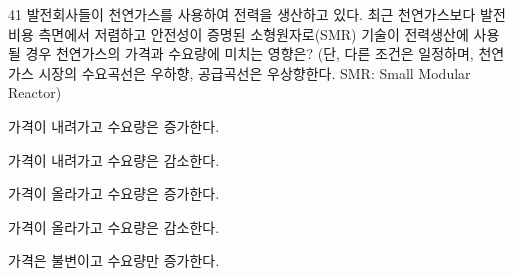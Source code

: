 \begin{question}{41}
발전회사들이 천연가스를 사용하여 전력을 생산하고 있다. 최근 천연가스보다 발전비용 측면에서 저렴하고 안전성이 증명된 소형원자로(SMR) 기술이 전력생산에 사용될 경우 천연가스의 가격과 수요량에 미치는 영향은? (단, 다른 조건은 일정하며, 천연가스 시장의 수요곡선은 우하향, 공급곡선은 우상향한다. SMR: Small Modular Reactor)
\begin{choices}
  \item 가격이 내려가고 수요량은 증가한다.
  \item 가격이 내려가고 수요량은 감소한다.
  \item 가격이 올라가고 수요량은 증가한다.
  \item 가격이 올라가고 수요량은 감소한다.
  \item 가격은 불변이고 수요량만 증가한다.
\end{choices}
\end{question}
